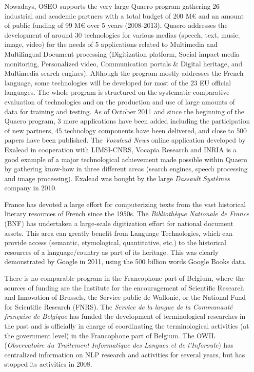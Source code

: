 \begin{multicols}{2}
Nowadays, OSEO supports the very large Quaero program gathering 26
industrial and academic partners with a total budget of 200 M€ and an
amount of public funding of 99 M€ over 5 years (2008-2013). Quaero
addresses the development of around 30 technologies for various medias
(speech, text, music, image, video) for the needs of 5 applications
related to Multimedia and Multilingual Document processing
(Digitization platform, Social impact media monitoring, Personalized
video, Communication portals \& Digital heritage, and Multimedia search
engines). Although the program mostly addresses the French language,
some technologies will be developed for most of the 23 EU official
languages. The whole program is structured on the systematic
comparative evaluation of technologies and on the production and use
of large amounts of data for training and testing. As of October 2011
and since the beginning of the Quaero program, 3 more applications
have been added including the participation of new partners, 45
technology components have been delivered, and close to 500 papers
have been published. The {\em Voxalead News} online application developed by
Exalead in cooperation with LIMSI-CNRS, Vocapia Research and INRIA is
a good example of a major technological achievement made possible
within Quaero by gathering know-how in three different areas (search
engines, speech processing and image processing). Exalead was bought
by the large {\em Dassault Systèmes} company in 2010.

France has devoted a large effort for computerizing texts from the
vast historical literary resources of French since the 1950s. The
{\em Bibliothèque Nationale de France} (BNF) has undertaken a large-scale
digitization effort for national document assets. This area can
greatly benefit from Language Technologies, which can provide access
(semantic, etymological, quantitative, etc.) to the historical
resources of a language/country as part of its heritage. This was
clearly demonstrated by Google in 2011, using the 500 billion words
Google Books data.

There is no comparable program in the Francophone part of Belgium,
where the sources of funding are the Institute for the encouragement
of Scientific Research and Innovation of Brussels, the Service public
de Wallonie, or the National Fund for Scientific Research (FNRS). The
{\em Service de la langue de la Communauté française de Belgique} has funded
the development of terminological researches in the past and is
officially in charge of coordinating the terminological activities (at
the government level) in the Francophone part of Belgium. The OWIL
({\em Observatoire du Traitement Informatique des Langues et de
l{\mbox '}Inforoute}) has centralized information on NLP research and
activities for several years, but has stopped its activities in 2008.


\end{multicols}

